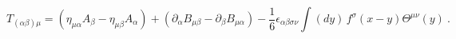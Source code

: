 \begin{equation}
T_{(\alpha \beta )\mu }=\left( \eta _{\mu \alpha }A_{\beta }-\eta _{\mu
\beta }A_{\alpha }\right) +\left( \partial _{\alpha }B_{\mu \beta }-\partial
_{\beta }B_{\mu \alpha }\right) -\frac{1}{6}\epsilon _{\alpha \beta \sigma
\nu }\int (dy)\,f^{\sigma }(x-y)\Theta ^{\mu \nu }(y)\ .
\end{equation}%
